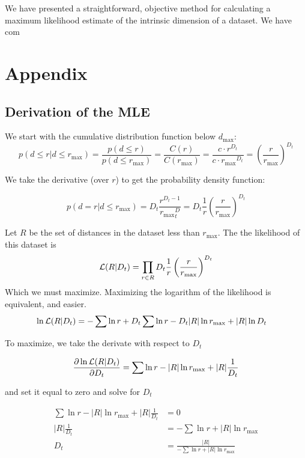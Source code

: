 \documentclass[10pt]{article}
\begin{document}
We have presented a straightforward, objective method for calculating a maximum likelihood estimate of the intrinsic dimension of a dataset. We have com 

\section{Appendix}

\subsection{Derivation of the MLE}

We start with the cumulative distribution function below $d_{\max}$:
\[
p(d \leq r | d \leq r_{\max}) = \frac{p(d \leq r)}{p(d \leq r_{\max})} = \frac{C(r)}{C(r_{\max})} = \frac{c \cdot r^{D_t}}{c \cdot {r_{\max}} ^ {D_t}} = \left ( \frac{r}{r_{\max}} \right )^{D_t}
\]

We take the derivative (over $r$) to get the probability density function:

\[
p(d = r | d \leq r_{\max}) = D_t \frac{r^{D_t-1}}{{r_{\max}}^D_t} = D_t \frac{1}{r} \left (\frac{r}{r_{\max}} \right ) ^ {D_t} 
\]

Let $R$ be the set of distances in the dataset less than $r_{\max}$. The the likelihood of this dataset is
\[
{\cal L}(R|D_t) = \prod_{r \in R} D_t \frac{1}{r} \left (\frac{r}{r_{\max}} \right ) ^ {D_t} 
\] 
Which we must maximize. Maximizing the logarithm of the likelihood is equivalent, and easier.
\begin{align*}
\ln {\cal L}(R|D_t) &= -\sum \ln r + D_t \sum \ln r - D_t |R| \ln r_{\max} + |R| \ln D_t
\end{align*}

To maximize, we take the derivate with respect to $D_t$

\begin{align*}
\frac{\partial \ln{\cal L}(R|D_t)}{\partial D_t} = \sum{\ln r} - |R|\ln r_{\max} + |R|\frac{1}{D_t}
\end{align*}

and set it equal to zero and solve for $D_t$

\begin{align*}
 \sum{\ln r} - |R|\ln r_{\max} + |R|\frac{1}{D_t} &= 0 \\
|R|\frac{1}{D_t} &= - \sum \ln r + |R| \ln r_{\max} \\
D_t &= \frac{|R|}{- \sum \ln r + |R| \ln r_{\max}} 
\end{align*}
\end{document}
